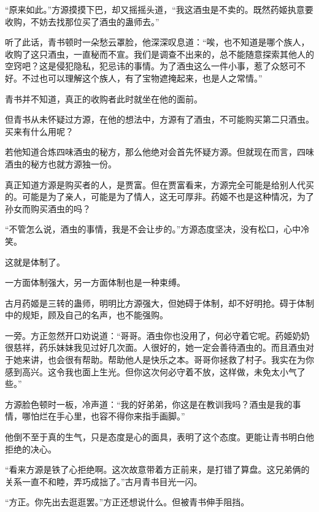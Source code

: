 
\begin{this_body}



“原来如此。”方源摸摸下巴，却又摇摇头道，“我这酒虫是不卖的。既然药姬执意要收购，不妨去找那位买了酒虫的蛊师去。”

听了此话，青书顿时一朵愁云罩脸，他深深叹息道：“唉，也不知道是哪个族人，收购了这只酒虫，一直秘而不宣。我们是调查不出来的，总不能随意探索其他人的空窍吧？这是侵犯隐私，犯忌讳的事情。为了酒虫这么一件小事，惹了众怒可不好。不过也可以理解这个族人，有了宝物遮掩起来，也是人之常情。”

青书并不知道，真正的收购者此时就坐在他的面前。

但青书从未怀疑过方源，在他的想法中，方源有了酒虫，不可能购买第二只酒虫。买来有什么用呢？

若他知道合炼四味酒虫的秘方，那么他绝对会首先怀疑方源。但就现在而言，四味酒虫的秘方也就方源独一份。

真正知道方源是购买者的人，是贾富。但在贾富看来，方源完全可能是给别人代买的。可能是为了亲人，可能是为了情人，这无可厚非。药姬不也是这种情况，为了孙女而购买酒虫的吗？

“不管怎么说，酒虫的事情，我是不会让步的。”方源态度坚决，没有松口，心中冷笑。

这就是体制了。

一方面体制强大，另一方面体制也是一种束缚。

古月药姬是三转的蛊师，明明比方源强大，但她碍于体制，却不好明抢。碍于体制中的规矩，顾及自己的名声，也不能强购。

一旁。方正忽然开口劝说道：“哥哥。酒虫你也没用了，何必守着它呢。药姬奶奶很慈祥，药乐妹妹我见过好几次面。人很好的，她一定会善待酒虫的。而且酒虫对于她来讲，也会很有帮助。帮助他人是快乐之本。哥哥你拯救了村子。我实在为你感到高兴。这令我也面上生光。但你这次何必守着不放，这样做，未免太小气了些。”

方源脸色顿时一板，冷声道：“我的好弟弟，你这是在教训我吗？酒虫是我的事情，哪怕烂在手心里，也容不得你来指手画脚。”

他倒不至于真的生气，只是态度是心的面具，表明了这个态度。更能让青书明白他拒绝的决心。

“看来方源是铁了心拒绝啊。这次故意带着方正前来，是打错了算盘。这兄弟俩的关系一直不和睦，弄巧成拙了。”古月青书目光一闪。

“方正。你先出去逛逛罢。”方正还想说什么。但被青书伸手阻挡。


\end{this_body}
